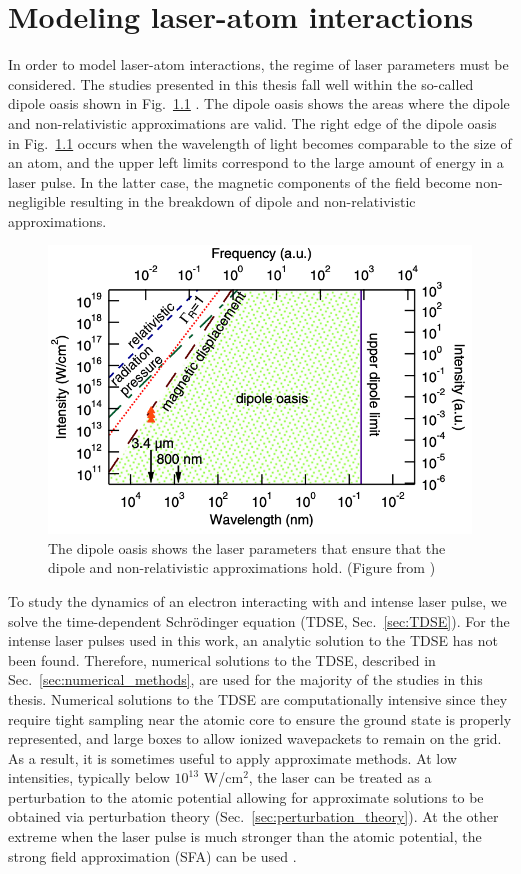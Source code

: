 \chapter{Modeling laser-atom interactions}
\label{cha:numberic_methods}

In order to model laser-atom interactions, the regime of laser parameters must be considered. The studies presented in this thesis fall well within the so-called dipole oasis shown in Fig.~\ref{fig:dipole_oais} \cite{ludwig2014}. The dipole oasis shows the areas where the dipole and non-relativistic approximations are valid. The right edge of the dipole oasis in Fig.~\ref{fig:dipole_oais} occurs when the wavelength of light becomes comparable to the size of an atom, and the upper left limits correspond to the large amount of energy in a laser pulse. In the latter case, the magnetic components of the field become non-negligible resulting in the breakdown of dipole and non-relativistic approximations.

\begin{figure}[!ht]
\begin{center}
    \includegraphics[width=0.49\linewidth]{figs/dipole_oasis.png}
\end{center}
\caption{The dipole oasis shows the laser parameters that ensure that the dipole and non-relativistic approximations hold. (Figure from \cite{ludwig2014})
}
  \label{fig:dipole_oais}
\end{figure}

To study the dynamics of an electron interacting with and intense laser pulse, we solve the time-dependent Schr\"odinger equation (TDSE, Sec.~\ref{sec:TDSE}). For the intense laser pulses used in this work, an analytic solution to the TDSE has not been found. Therefore, numerical solutions to the TDSE, described in Sec.~\ref{sec:numerical_methods}, are used for the majority of the studies in this thesis.
Numerical solutions to the TDSE are computationally intensive since they require tight sampling near the atomic core to ensure the ground state is properly represented, and large boxes to allow ionized wavepackets to remain on the grid. As a result, it is sometimes useful to apply approximate methods. At low intensities, typically below $10^{13}$ W/cm$^2$, the laser can be treated as a perturbation to the atomic potential allowing for approximate solutions to be obtained via perturbation theory (Sec.~\ref{sec:perturbation_theory}). At the other extreme when the laser pulse is much stronger than the atomic potential, the strong field approximation (SFA) can be used \cite{krainov1997,faisal1973,reiss1980}.

